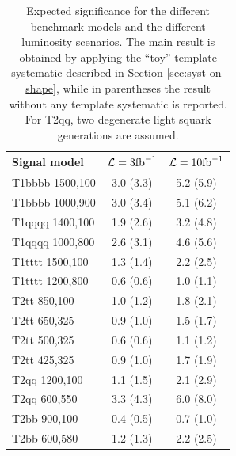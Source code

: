\begin{table}
  \centering
  \caption{Expected significance for the different benchmark models and the different luminosity scenarios. 
    The main result is obtained by applying 
  the ``toy'' template systematic described in Section \ref{sec:syst-on-shape},
while in parentheses the result without any template systematic is reported. 
For T2qq, two degenerate light squark generations are assumed.}

  \label{tab:results_signif}
  \footnotesize
  \footnotesize
  \begin{tabular}{lcc}
    \hline
    \hline
    Signal model & $\mathcal{L} = 3 \text{fb}^{-1}$ & $\mathcal{L} = 10 \text{fb}^{-1}$ \\
    \hline
    \hline
    T1bbbb 1500,100  & 3.0 (3.3) & 5.2 (5.9) \\  
    T1bbbb 1000,900  & 3.0 (3.4) & 5.1 (6.2) \\  
    T1qqqq 1400,100  & 1.9 (2.6) & 3.2 (4.8) \\  
    T1qqqq 1000,800  & 2.6 (3.1) & 4.6 (5.6) \\  
    T1tttt 1500,100  & 1.3 (1.4) & 2.2 (2.5) \\  
    T1tttt 1200,800  & 0.6 (0.6) & 1.0 (1.1) \\  \hline
    T2tt 850,100     & 1.0 (1.2) & 1.8 (2.1) \\  
    T2tt 650,325     & 0.9 (1.0) & 1.5 (1.7) \\  
    T2tt 500,325     & 0.6 (0.6) & 1.1 (1.2) \\  
    T2tt 425,325     & 0.9 (1.0) & 1.7 (1.9) \\  
    T2qq 1200,100    & 1.1 (1.5) & 2.1 (2.9) \\  
    T2qq 600,550     & 3.3 (4.3) & 6.0 (8.0) \\  
    T2bb 900,100     & 0.4 (0.5) & 0.7 (1.0) \\  
    T2bb 600,580     & 1.2 (1.3) & 2.2 (2.5) \\  
    \hline
    \hline
  \end{tabular} 
\end{table}


